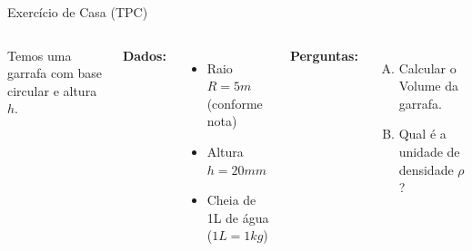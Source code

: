 \documentclass{beamer}
\begin{document}
	\begin{frame}{Exercício de Casa (TPC)}
		\begin{columns}
			
			Temos uma garrafa com base circular e altura $h$.
			
			\textbf{Dados:}
			\begin{itemize}
				\item Raio $R = 5 m$ (conforme nota)
				\item Altura $h = 20 mm$ 
				\item Cheia de 1L de água ($1L = 1kg$)
			\end{itemize}
			
			\vspace{0.5cm}
			\textbf{Perguntas:}
			\begin{enumerate}[A)]
				\item Calcular o Volume da garrafa.
				\item Qual é a unidade de densidade $\rho$?
			\end{enumerate}
		\end{columns}
	\end{frame}
	
\end{document}
